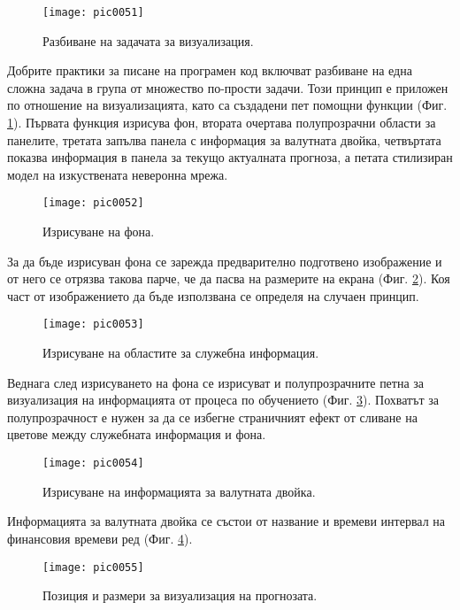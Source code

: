 \begin{figure}[h]
  \centering
  \texttt{[image: pic0051]}
  \caption{Разбиване на задачата за визуализация.}
\label{fig:pic0051}
\end{figure}
\FloatBarrier

Добрите практики за писане на програмен код включват разбиване на една сложна задача в група от множество по-прости задачи. Този принцип е приложен по отношение на визуализацията, като са създадени пет помощни функции (Фиг. \ref{fig:pic0051}).  Първата функция изрисува фон, втората очертава полупрозрачни области за панелите, третата запълва панела с информация за валутната двойка, четвъртата показва информация в панела за текущо актуалната прогноза, а петата стилизиран модел на изкуствената неверонна мрежа. 

\begin{figure}[h]
  \centering
  \texttt{[image: pic0052]}
  \caption{Изрисуване на фона.}
\label{fig:pic0052}
\end{figure}
\FloatBarrier

За да бъде изрисуван фона се зарежда предварително подготвено изображение и от него се отрязва такова парче, че да пасва на размерите на екрана (Фиг. \ref{fig:pic0052}). Коя част от изображението да бъде използвана се определя на случаен принцип.

\begin{figure}[h]
  \centering
  \texttt{[image: pic0053]}
  \caption{Изрисуване на областите за служебна информация.}
\label{fig:pic0053}
\end{figure}
\FloatBarrier

Веднага след изрисуването на фона се изрисуват и полупрозрачните петна за визуализация на информацията от процеса по обучението (Фиг. \ref{fig:pic0053}). Похватът за полупрозрачност е нужен за да се избегне страничният ефект от сливане на цветове между служебната информация и фона. 

\begin{figure}[h]
  \centering
  \texttt{[image: pic0054]}
  \caption{Изрисуване на информацията за валутната двойка.}
\label{fig:pic0054}
\end{figure}
\FloatBarrier

Информацията за валутната двойка се състои от название и времеви интервал на финансовия времеви ред (Фиг. \ref{fig:pic0054}). 

\begin{figure}[h]
  \centering
  \texttt{[image: pic0055]}
  \caption{Позиция и размери за визуализация на прогнозата.}
\label{fig:pic0055}
\end{figure}
\FloatBarrier

